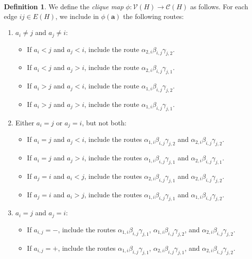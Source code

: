 \documentclass[12pt]{amsart}
\theoremstyle{definition}
\newtheorem{definition}[theorem]{Definition}
\newcommand\ba{\mathbf{a}}
\newcommand{\cliques}{\mathcal{C}}
\newcommand{\cliquevs}{\mathcal{V}}
\begin{document}
\begin{definition}\label{def:cliquemap}
    We define the \emph{clique map} $\phi:\cliquevs(H)\to \cliques(H)$ as follows.
    For each edge $ij\in E(H)$, we include in $\phi(\ba)$ the following routes:
    \begin{enumerate}
    \item[(i)] $a_i\neq j$ and $a_j\neq i$:
        \begin{itemize}
        \item If $a_i<j$ and $a_j<i$, include the route $\alpha_{2,i}\beta_{i,j}\gamma_{j,2}$.
        \item If $a_i<j$ and $a_j>i$, include the route $\alpha_{2,i}\beta_{i,j}\gamma_{j,1}$.
        \item If $a_i>j$ and $a_j<i$, include the route $\alpha_{1,i}\beta_{i,j}\gamma_{j,2}$.
        \item If $a_i>j$ and $a_j>i$, include the route $\alpha_{1,i}\beta_{i,j}\gamma_{j,1}$.
        \end{itemize}
        \item[(ii)] Either $a_i=j$ or $a_j=i$, but not both:
        \begin{itemize}
        \item If $a_i=j$ and $a_j<i$, include the routes $\alpha_{1,i}\beta_{i,j}\gamma_{j,2}$ and $\alpha_{2,i}\beta_{i,j}\gamma_{j,2}$.
        \item If $a_i=j$ and $a_j>i$, include the routes $\alpha_{1,i}\beta_{i,j}\gamma_{j,1}$ and $\alpha_{2,i}\beta_{i,j}\gamma_{j,1}$.
        \item If $a_j=i$ and $a_i<j$, include the routes $\alpha_{2,i}\beta_{i,j}\gamma_{j,1}$ and $\alpha_{2,i}\beta_{i,j}\gamma_{j,2}$.
        \item If $a_j=i$ and $a_i>j$, include the routes $\alpha_{1,i}\beta_{i,j}\gamma_{j,1}$ and $\alpha_{1,i}\beta_{i,j}\gamma_{j,2}$.
        \end{itemize}
        \item[(iii)] $a_i=j$ and $a_j=i$:
    \begin{itemize}
        \item If $a_{i,j}=-$, include the routes $\alpha_{1,i}\beta_{i,j}\gamma_{j,1}$, $\alpha_{1,i}\beta_{i,j}\gamma_{j,2}$, and $\alpha_{2,i}\beta_{i,j}\gamma_{j,2}$.
        \item If $a_{i,j}=+$, include the routes $\alpha_{1,i}\beta_{i,j}\gamma_{j,1}$, $\alpha_{2,i}\beta_{i,j}\gamma_{j,1}$, and $\alpha_{2,i}\beta_{i,j}\gamma_{j,2}$.
        \end{itemize}
    \end{enumerate}
\end{definition}
\end{document}
